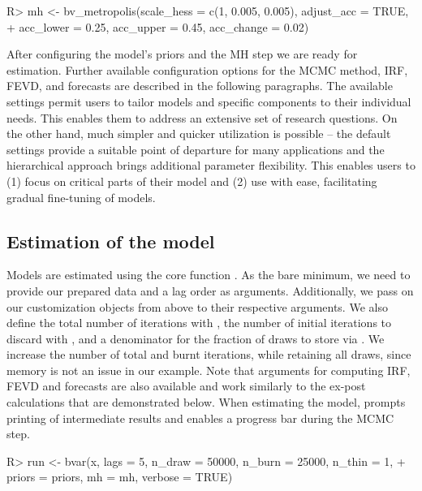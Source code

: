 \documentclass[article,nojss]{jss} %
\begin{document}
\begin{Schunk}
\begin{Sinput}
R> mh <- bv_metropolis(scale_hess = c(1, 0.005, 0.005), adjust_acc = TRUE,
+    acc_lower = 0.25, acc_upper = 0.45, acc_change = 0.02)
\end{Sinput}
\end{Schunk}

After configuring the model's priors and the MH step we are ready for estimation. Further available configuration options for the MCMC method, IRF, FEVD, and forecasts are described in the following paragraphs.
The available settings permit users to tailor models and specific components to their individual needs. This enables them to address an extensive set of research questions.
On the other hand, much simpler and quicker utilization is possible -- the default settings provide a suitable point of departure for many applications and the hierarchical approach brings additional parameter flexibility.
This enables users to (1) focus on critical parts of their model and (2) use  with ease, facilitating gradual fine-tuning of models.

\subsection{Estimation of the model}

Models are estimated using the core function .
As the bare minimum, we need to provide our prepared data and a lag order as arguments. Additionally, we pass on our customization objects from above to their respective arguments.
We also define the total number of iterations with , the number of initial iterations to discard with , and a denominator for the fraction of draws to store via . We increase the number of total and burnt iterations, while retaining all draws, since memory is not an issue in our example.
Note that arguments for computing IRF, FEVD and forecasts are also available and work similarly to the ex-post calculations that are demonstrated below.
When estimating the model,  prompts printing of intermediate results and enables a progress bar during the MCMC step.

\begin{Schunk}
\begin{Sinput}
R> run <- bvar(x, lags = 5, n_draw = 50000, n_burn = 25000, n_thin = 1,
+    priors = priors, mh = mh, verbose = TRUE)
\end{Sinput}
\end{Schunk}
\end{document}
